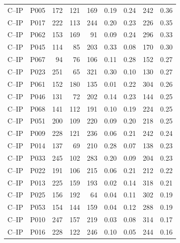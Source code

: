 \documentclass[11pt,a4paper,chapterprefix=false,parskip=false]{scrreprt}
\begin{document}
\begin{appendices}
\begin{longtable}{@{}llrrrrrrr@{}}
        C--IP  & P005 & 172 & 121 & 169 & 0.19         & 0.24         & 242                & 0.36  \\
        C--IP  & P017 & 222 & 113 & 244 & 0.20         & 0.23         & 226                & 0.35  \\
        C--IP  & P062 & 153 & 169 & 91  & 0.09         & 0.24         & 296                & 0.33  \\
        C--IP  & P045 & 114 & 85  & 203 & 0.33         & 0.08         & 170                & 0.30  \\
        C--IP  & P067 & 94  & 76  & 106 & 0.11         & 0.28         & 152                & 0.27  \\
        C--IP  & P023 & 251 & 65  & 321 & 0.30         & 0.10         & 130                & 0.27  \\
        C--IP  & P061 & 152 & 180 & 135 & 0.01         & 0.22         & 304                & 0.26  \\
        C--IP  & P046 & 131 & 72  & 202 & 0.14         & 0.23         & 144                & 0.25  \\
        C--IP  & P068 & 141 & 112 & 191 & 0.10         & 0.19         & 224                & 0.25  \\
        C--IP  & P051 & 200 & 109 & 220 & 0.09         & 0.20         & 218                & 0.25  \\
        C--IP  & P009 & 228 & 121 & 236 & 0.06         & 0.21         & 242                & 0.24  \\
        C--IP  & P014 & 137 & 69  & 210 & 0.28         & 0.07         & 138                & 0.23  \\
        C--IP  & P033 & 245 & 102 & 283 & 0.20         & 0.09         & 204                & 0.23  \\
        C--IP  & P022 & 191 & 106 & 215 & 0.06         & 0.21         & 212                & 0.22  \\
        C--IP  & P013 & 225 & 159 & 193 & 0.02         & 0.14         & 318                & 0.21  \\
        C--IP  & P025 & 156 & 192 & 64  & 0.04         & 0.11         & 302                & 0.19  \\
        C--IP  & P053 & 154 & 144 & 159 & 0.04         & 0.12         & 288                & 0.19  \\
        C--IP  & P010 & 247 & 157 & 219 & 0.03         & 0.08         & 314                & 0.17  \\
        C--IP  & P016 & 228 & 122 & 246 & 0.10         & 0.05         & 244                & 0.16  \\

\end{longtable}
\end{appendices}
\end{document}
